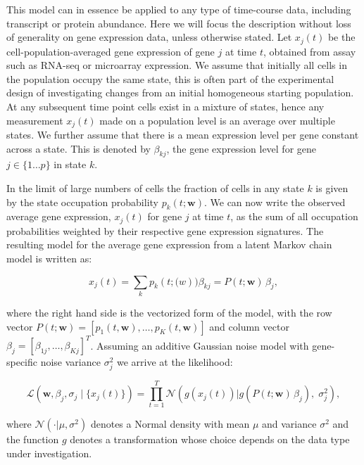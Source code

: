 This model can in essence be applied to any type of time-course data, including transcript or protein abundance. Here we will focus the description without loss of generality on gene expression data, unless otherwise stated. Let $x_j(t)$ be the cell-population-averaged gene expression of gene $j$ at time $t$, obtained from assay
such as RNA-seq or microarray expression. We assume that initially all cells in the population occupy the same state, this is often part of the experimental design of investigating changes from an initial homogeneous starting population. At any subsequent time point cells exist in a mixture of states, hence any measurement $x_j(t)$ made on a population level is an average over multiple states. We further assume that there is a mean expression level per gene constant across a state. This is denoted by $\beta_{kj}$, the gene expression level for gene $j \in \lbrace 1 \ldots p \rbrace$ in state $k$.

In the limit of large numbers of cells the fraction of cells in any state $k$ is given by the state occupation probability $p_k(t;\mathbf{w})$. We can now write the observed average gene expression, $x_j(t)$ for gene $j$ at time $t$, as the sum of all occupation probabilities weighted by their respective gene expression signatures. The resulting model for the average gene expression from a latent Markov chain model is written as:

\begin{equation}
  x_j(t) = \sum_k p_k(t;\mathbf(w))\beta_{kj} = P(t;\mathbf{w}) \, \beta_j,
  \label{eq:model}
\end{equation}

where the right hand side is the vectorized form of the model, with the row vector $P(t;\mathbf{w}) = [p_1(t,\mathbf{w}), \ldots , p_K(t,\mathbf{w})]$ and column vector $\beta_j = [\beta_{1j}, \ldots , \beta_{Kj}]^T$. Assuming an additive Gaussian noise model with gene-specific noise variance $\sigma_j^2 $ we arrive at the likelihood:

\begin{equation}
  \label{eq:likelihood}
    \mathcal{L} \left(\mathbf{w}, \beta_j, \sigma_j \;|\; \lbrace x_j(t)\rbrace\right) = 
\prod_{t=1}^T \mathcal{N}\left(g(x_j(t)) | g\left(P(t; \mathbf{w})\,\beta_j\right),\; \sigma_j^2 \right),
\end{equation}

where $\mathcal{N}(\cdot | \mu,\sigma^2)$ denotes a Normal density with mean $\mu$ and variance $\sigma^2$ and the function $g$ denotes a transformation whose choice depends on the data type under investigation.

